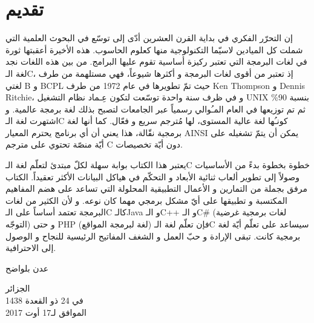 \chapter*{تقديم}
إن التحرّر الفكري في بداية القرن العشرين أدّى إلى توسّع في البحوث العلمية التي شملت كل الميادين لاسيّما التكنولوجية منها كعلوم الحاسوب. هذه الأخيرة أعقبتها ثورة في لغات البرمجة التي تعتبر ركيزة أساسية تقوم عليها البرامج. من بين هذه اللغات نجد لغة الـ\textenglish{C}،
إذ تعتبر من أقوى لغات البرمجة و أكثرها شيوعاً، فهي مستلهمة من طرف لغتي
 \textenglish{B}
 و
 \textenglish{BCPL}
حيث تمّ تطويرها في عام 1972 من طرف
\textenglish{Ken Thompson}
و
 \textenglish{Dennis Ritchie}،
و في ظرف سنة واحدة توسّعت لتكون عِـماد نظام التشغيل
\textenglish{UNIX}
بنسبة
90\%
ثم تم توزيعها في العام المـُوالي رسمياً عبر الجامعات لتصبح بذلك لغة برمجة عالمية. و اشتهرت لغة الـ\textenglish{C}
 كونـُها لغة عالية المستوى، لها مُترجم سريع و فعّال. كما أنها لغة برمجية نقّالة، هذا يعني أن أي برنامج يحترم المعيار
\textenglish{AINSI}
يمكن أن يتمّ تشغيله على أيّة منصّة تحتوي على مترجم
\textenglish{C}
 دون أيّة تخصيصات.

يعتبر هذا الكتاب بوابة سهلة لكلّ مبتدئ لتعلّم لغة الـ\textenglish{C}
خطوة بخطوة بدءً من الأساسيات وصولاً إلى تطوير ألعاب ثنائية الأبعاد و التحكّم في هياكل البيانات الأكثر تعقيداً. الكتاب مرفق بجملة من التمارين و الأعمال التطبيقية المحلولة التي تساعد على هضم المفاهيم المكتسبة و تطبيقها على أيّ مشكل برمجي مهما كان نوعه. و لأن الكثير من لغات البرمجة تعتمد أساساً على الـ\textenglish{C}
كالـ\textenglish{Java}
و الـ\textenglish{C++}
و الـ\textenglish{C\#}
(لغات برمجية غرضية التوجّه) و حتى
\textenglish{PHP}
(لغة لبرمجة المواقع) فإن تعلّم لغة الـ\textenglish{C}
 سيساعد على تعلّم أيّة لغة برمجية كانت. تبقى الإرادة و حبّ العمل و الشغف المفاتيح الرئيسية للنجاح و الوصول إلى الاحترافية.

\vfill

\hfill\parbox{0.3\textwidth}{\centering
عدن بلواضح

\vspace{1em}
الجزائر\\[0.5em]
في
24 ذو القعدة 1438\\[0.3em]
الموافق لـ17 أوت 2017

}

